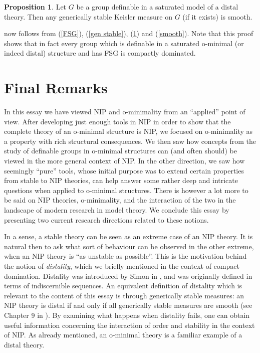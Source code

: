 \documentclass[a4paper]{report}
\newcommand{\ind}{\hspace{15pt}}
\theoremstyle{definition}
\newtheorem{prop}[thm]{Proposition}
\theoremstyle{remstyle}
\newcommand{\uchapter}[1]{%
	\chapter*{#1}%
	\markboth{#1}{}%
	\addcontentsline{toc}{chapter}{#1}%
}
\begin{document}
\begin{prop}\label{distal}
	Let $G$ be a group definable in a saturated model of a distal theory. Then any generically stable Keisler measure on $G$ (if it exists) is smooth.
\end{prop}

\ind {} now follows from (\ref{FSG}), (\ref{gen stable}), (\ref{distal}) and (\ref{smooth}). Note that this proof shows that in fact every group which is definable in a saturated o-minimal (or indeed distal) structure and has FSG is compactly dominated.

\newpage
\uchapter{Final Remarks}

\ind In this essay we have viewed NIP and o-minimality from an ``applied'' point of view. After developing just enough tools in NIP in order to show that the complete theory of an o-minimal structure is NIP, we focused on o-minimality as a property with rich structural consequences. We then saw how concepts from the study of definable groups in o-minimal structures can (and often should) be viewed in the more general context of NIP. In the other direction, we saw how seemingly ``pure'' tools, whose initial purpose was to extend certain properties from stable to NIP theories, can help answer some rather deep and intricate questions when applied to o-minimal structures. There is however a lot more to be said on NIP theories, o-minimality, and the interaction of the two in the landscape of modern research in model theory. We conclude this essay by presenting two current research directions related to these notions.

\ind In a sense, a stable theory can be seen as an extreme case of an NIP theory. It is natural then to ask what sort of behaviour can be observed in the other extreme, when an NIP theory is ``as unstable as possible''. This is the motivation behind the notion of \emph{distality}, which we briefly mentioned in the context of compact domination. Distality was introduced by Simon in \cite{distal}, and was originally defined in terms of indiscernible sequences. An equivalent definition of distality which is relevant to the content of this essay is through generically stable measures: an NIP theory is distal if and only if all generically stable measures are smooth (see Chapter 9 in \cite{nip guide}). By examining what happens when distality fails, one can obtain useful information concerning the interaction of order and stability in the context of NIP. As already mentioned, an o-minimal theory is a familiar example of a distal theory.
\end{document}
